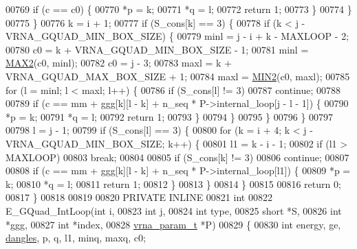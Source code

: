 \begin{DoxyCode}
00769       \textcolor{keywordflow}{if} (c == c0) \{
00770         *p  = k;
00771         *q  = l;
00772         \textcolor{keywordflow}{return} 1;
00773       \}
00774     \}
00775   \}
00776   k = i + 1;
00777   \textcolor{keywordflow}{if} (S\_cons[k] == 3) \{
00778     \textcolor{keywordflow}{if} (k < j - VRNA\_GQUAD\_MIN\_BOX\_SIZE) \{
00779       minl  = j - i + k - MAXLOOP - 2;
00780       c0    = k + VRNA\_GQUAD\_MIN\_BOX\_SIZE - 1;
00781       minl  = \hyperlink{group__utils_ga33297b3679c713b0c4d897cd0fe3b122}{MAX2}(c0, minl);
00782       c0    = j - 3;
00783       maxl  = k + VRNA\_GQUAD\_MAX\_BOX\_SIZE + 1;
00784       maxl  = \hyperlink{group__utils_gae0b9cd0ce090bd69b951aa73e8fa4f7d}{MIN2}(c0, maxl);
00785       \textcolor{keywordflow}{for} (l = minl; l < maxl; l++) \{
00786         \textcolor{keywordflow}{if} (S\_cons[l] != 3)
00787           \textcolor{keywordflow}{continue};
00788 
00789         \textcolor{keywordflow}{if} (c == mm + ggg[k][l - k] + n\_seq * P->internal\_loop[j - l - 1]) \{
00790           *p  = k;
00791           *q  = l;
00792           \textcolor{keywordflow}{return} 1;
00793         \}
00794       \}
00795     \}
00796   \}
00797 
00798   l = j - 1;
00799   \textcolor{keywordflow}{if} (S\_cons[l] == 3) \{
00800     \textcolor{keywordflow}{for} (k = i + 4; k < j - VRNA\_GQUAD\_MIN\_BOX\_SIZE; k++) \{
00801       l1 = k - i - 1;
00802       \textcolor{keywordflow}{if} (l1 > MAXLOOP)
00803         \textcolor{keywordflow}{break};
00804 
00805       \textcolor{keywordflow}{if} (S\_cons[k] != 3)
00806         \textcolor{keywordflow}{continue};
00807 
00808       \textcolor{keywordflow}{if} (c == mm + ggg[k][l - k] + n\_seq * P->internal\_loop[l1]) \{
00809         *p  = k;
00810         *q  = l;
00811         \textcolor{keywordflow}{return} 1;
00812       \}
00813     \}
00814   \}
00815 
00816   \textcolor{keywordflow}{return} 0;
00817 \}
00818 
00819 
00820 PRIVATE INLINE
00821 \textcolor{keywordtype}{int}
00822 E\_GQuad\_IntLoop(\textcolor{keywordtype}{int}           i,
00823                 \textcolor{keywordtype}{int}           j,
00824                 \textcolor{keywordtype}{int}           type,
00825                 \textcolor{keywordtype}{short}         *S,
00826                 \textcolor{keywordtype}{int}           *ggg,
00827                 \textcolor{keywordtype}{int}           *index,
00828                 \hyperlink{group__energy__parameters_structvrna__param__s}{vrna\_param\_t}  *P)
00829 \{
00830   \textcolor{keywordtype}{int}   energy, ge, \hyperlink{group__model__details_ga72b511ed1201f7e23ec437e468790d74}{dangles}, p, q, l1, minq, maxq, c0;

\end{DoxyCode}
